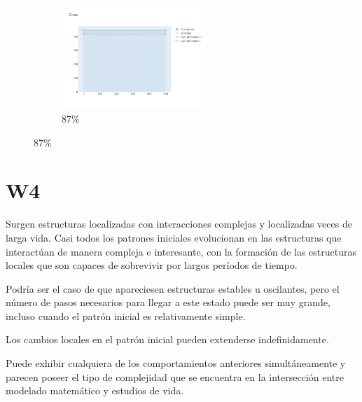 \documentclass[12pt, fleqn]{report}                             %
\theoremstyle{break}                                            %
\begin{document}
\begin{figure}[ht!]
\begin{subfigure}[b]{0.4\linewidth}
          \includegraphics[width=0.6\textwidth]{Images/154/dia-d.png}
          \caption{87\%}
        \end{subfigure}
      \end{figure}
















      \clearpage
      \section{W4}

       
      Surgen estructuras localizadas con interacciones complejas y localizadas veces de larga vida. 
      Casi todos los patrones iniciales evolucionan en las estructuras que interactúan de 
      manera compleja e interesante, con la formación de las estructuras locales 
      que son capaces de sobrevivir por largos períodos de tiempo. 
      
      Podría ser el caso de que apareciesen estructuras estables u oscilantes, 
      pero el número de pasos necesarios para llegar a este estado puede ser muy grande, 
      incluso cuando el patrón inicial es relativamente simple. 
      
      Los cambios locales en el patrón inicial pueden extenderse indefinidamente.

      Puede exhibir cualquiera de los comportamientos anteriores
      simultáneamente y parecen poseer el tipo de complejidad
      que se encuentra en la intersección entre modelado matemático y
      estudios de vida.
\end{document}
